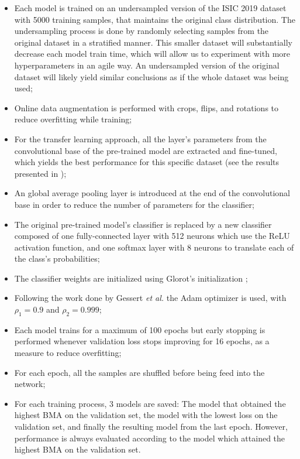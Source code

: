     \begin{itemize}
        \item Each model is trained on an undersampled version of the \ac{ISIC} 2019 dataset with 5000 training samples, that maintains the original class distribution. The undersampling process is done by randomly selecting samples from the original dataset in a stratified manner. This smaller dataset will substantially decrease each model train time, which will allow us to experiment with more hyperparameters in an agile way. An undersampled version of the original dataset will likely yield similar conclusions as if the whole dataset was being used;
        \item Online data augmentation is performed with crops, flips, and rotations to reduce overfitting while training;
        \item For the transfer learning approach, all the layer's parameters from the convolutional base of the pre-trained model are extracted and fine-tuned, which yields the best performance for this specific dataset (see the results presented in );
        \item An global average pooling layer is introduced at the end of the convolutional base in order to reduce the number of parameters for the classifier;
        \item The original pre-trained model's classifier is replaced by a new classifier composed of one fully-connected layer with 512 neurons which use the ReLU activation function, and one softmax layer with 8 neurons to translate each of the class's probabilities;
        \item The classifier weights are initialized using Glorot's initialization \cite{Glorot2010};
        \item Following the work done by Gessert \textit{et al.} \cite{gessert2018} the Adam optimizer \cite{adam} is used, with $\rho_{1} = 0.9$ and $\rho_{2}=0.999$;
        \item Each model trains for a maximum of 100 epochs but early stopping is performed whenever validation loss stops improving for 16 epochs, as a measure to reduce overfitting;
        \item For each epoch, all the samples are shuffled before being feed into the network;
        \item For each training process, 3 models are saved: The model that obtained the highest \ac{BMA} on the validation set, the model with the lowest loss on the validation set, and finally the resulting model from the last epoch. However, performance is always evaluated according to the model which attained the highest \ac{BMA} on the validation set. 
    \end{itemize}
    
